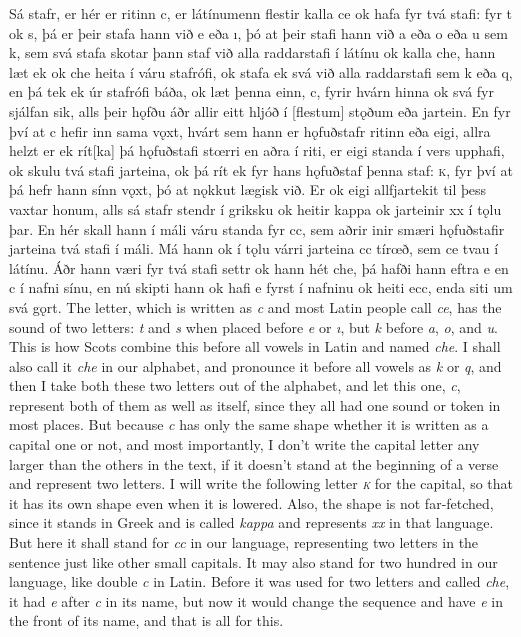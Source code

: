 \begin{paracol}{2}
  Sá stafr, er hér er ritinn c, er látínumenn flestir kalla ce ok hafa fyr tvá stafi: fyr t ok s, þá er þeir stafa hann við e eða ı, þó at þeir stafi hann við a eða o eða u sem k, sem svá stafa skotar þann staf við alla raddarstafi í látínu ok kalla che, hann læt ek ok che heita í váru stafrófi, ok stafa ek svá við alla raddarstafi sem k eða q, en þá tek ek úr stafrófi báða, ok læt þenna einn, c, fyrir hvárn hinna ok svá fyr sjálfan sik, alls þeir hǫfðu áðr allir eitt hljóð í [flestum] stǫðum eða jartein. En fyr því at c hefir inn sama vǫxt, hvárt sem hann er hǫfuðstafr ritinn eða eigi, allra helzt er ek rít[ka] þá hǫfuðstafi stœrri en aðra í riti, er eigi standa í vers upphafi, ok skulu tvá stafi jarteina, ok þá rít ek fyr hans hǫfuðstaf þenna staf: \textsc{k}, fyr því at þá hefr hann sínn vǫxt, þó at nǫkkut lægisk við. Er ok eigi allfjartekit til þess vaxtar honum, alls sá stafr stendr í griksku ok heitir kappa ok jarteinir xx í tǫlu þar. En hér skall hann í máli váru standa fyr cc, sem aðrir inir smæri hǫfuðstafir jarteina tvá stafi í máli. Má hann ok í tǫlu várri jarteina cc tírœð, sem ce tvau í látínu. Áðr hann væri fyr tvá stafi settr ok hann hét che, þá hafði hann eftra e en c í nafni sínu, en nú skipti hann ok hafi e fyrst í nafninu ok heiti ecc, enda siti um svá gǫrt.
  \switchcolumn
  The letter, which is written as \textit{c} and most Latin people call \textit{ce}, has the sound of two letters: \textit{t} and \textit{s} when placed before \textit{e} or \textit{ı}, but \textit{k} before \textit{a}, \textit{o}, and \textit{u}. This is how Scots combine this before all vowels in Latin and named \textit{che}. I shall also call it \textit{che} in our alphabet, and pronounce it before all vowels as \textit{k} or \textit{q}, and then I take both these two letters out of the alphabet, and let this one, \textit{c}, represent both of them as well as itself, since they all had one sound or token in most places. But because \textit{c} has only the same shape whether it is written as a capital one or not, and most importantly, I don't write the capital letter any larger than the others in the text, if it doesn't stand at the beginning of a verse and represent two letters. I will write the following letter \textit{\textsc{k}} for the capital, so that it has its own shape even when it is lowered. Also, the shape is not far-fetched, since it stands in Greek and is called \textit{kappa} and represents \textit{xx} in that language. But here it shall stand for \textit{cc} in our language, representing two letters in the sentence just like other small capitals. It may also stand for two hundred in our language, like double \textit{c} in Latin. Before it was used for two letters and called \textit{che}, it had \textit{e} after \textit{c} in its name, but now it would change the sequence and have \textit{e} in the front of its name, and that is all for this.
\end{paracol}
